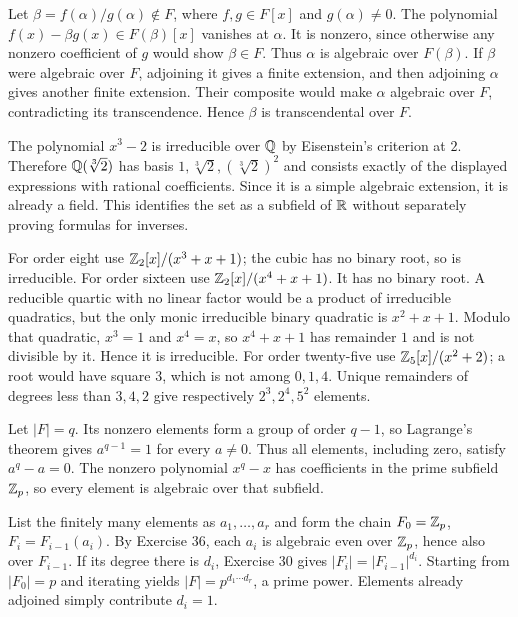 Let $\beta=f(\alpha)/g(\alpha)\notin F$, where $f,g\in F[x]$ and $g(\alpha)\ne0$. The polynomial $f(x)-\beta g(x)\in F(\beta)[x]$ vanishes at $\alpha$. It is nonzero, since otherwise any nonzero coefficient of $g$ would show $\beta\in F$. Thus $\alpha$ is algebraic over $F(\beta)$.
If $\beta$ were algebraic over $F$, adjoining it gives a finite extension, and then adjoining $\alpha$ gives another finite extension. Their composite would make $\alpha$ algebraic over $F$, contradicting its transcendence. Hence $\beta$ is transcendental over $F$.

The polynomial $x^3-2$ is irreducible over $\mathbb{Q}$ by Eisenstein's criterion at $2$. Therefore $\mathbb{Q}(\sqrt[3]2)$ has basis $1,\sqrt[3]2,(\sqrt[3]2)^2$ and consists exactly of the displayed expressions with rational coefficients. Since it is a simple algebraic extension, it is already a field. This identifies the set as a subfield of $\mathbb{R}$ without separately proving formulas for inverses.

For order eight use $\mathbb{Z}_2[x]/(x^3+x+1)$; the cubic has no binary root, so is irreducible.
For order sixteen use $\mathbb{Z}_2[x]/(x^4+x+1)$. It has no binary root. A reducible quartic with no linear factor would be a product of irreducible quadratics, but the only monic irreducible binary quadratic is $x^2+x+1$. Modulo that quadratic, $x^3=1$ and $x^4=x$, so $x^4+x+1$ has remainder $1$ and is not divisible by it. Hence it is irreducible.
For order twenty-five use $\mathbb{Z}_5[x]/(x^2+2)$; a root would have square $3$, which is not among $0,1,4$. Unique remainders of degrees less than $3,4,2$ give respectively $2^3,2^4,5^2$ elements.

Let $|F|=q$. Its nonzero elements form a group of order $q-1$, so Lagrange's theorem gives $a^{q-1}=1$ for every $a\ne0$. Thus all elements, including zero, satisfy $a^q-a=0$. The nonzero polynomial $x^q-x$ has coefficients in the prime subfield $\mathbb{Z}_p$, so every element is algebraic over that subfield.

List the finitely many elements as $a_1,\ldots,a_r$ and form the chain $F_0=\mathbb{Z}_p$, $F_i=F_{i-1}(a_i)$. By Exercise 36, each $a_i$ is algebraic even over $\mathbb{Z}_p$, hence also over $F_{i-1}$. If its degree there is $d_i$, Exercise 30 gives $|F_i|=|F_{i-1}|^{d_i}$. Starting from $|F_0|=p$ and iterating yields $|F|=p^{d_1\cdots d_r}$, a prime power. Elements already adjoined simply contribute $d_i=1$.
